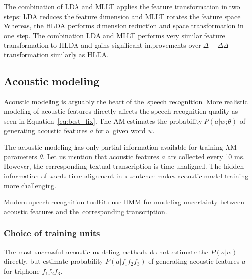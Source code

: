 {The combination of \ac{LDA} and \ac{MLLT} applies the feature transformation in two steps: \ac{LDA} reduces the feature dimension and \ac{MLLT} rotates the feature space \cite{gopinath1998maximum}
Whereas, the \ac{HLDA} performs dimension reduction and space transformation in one step.\cite{gales1999semi}
The combination \ac{LDA} and \ac{MLLT} performs very similar feature transformation to \ac{HLDA} and gains significant improvements over $\Delta+\Delta\Delta$ transformation similarly as \ac{HLDA}\cite{gales1999semi}\cite{gopinath1998maximum}.


\subsection{Acoustic modeling}
\label{sub:am}
Acoustic modeling is arguably the heart of the~speech recognition.
More realistic modeling of acoustic features directly affects the speech recognition quality as seen in Equation~\ref{eq:best_fix}. 
The \ac{AM} estimates the probability $P(a|w; \theta)$ of generating acoustic features $a$ for a~given word $w$.

The acoustic modeling has only partial information available for training \ac{AM} parameters $\theta$.
Let us mention that acoustic features $a$ are collected every 10 ms.
However, the corresponding textual transcription is time-unaligned.
The hidden information of words time alignment in a sentence makes acoustic model training more challenging.

Modern speech recognition toolkits use \acl{HMM}
for modeling uncertainty between acoustic features and the~corresponding transcription. 

\subsubsection*{Choice of training units}
The most successful acoustic modeling methods do not estimate the $P(a|w)$ directly, but estimate probability $P(a|f_1f_2f_3)$ of generating acoustic features $a$ for triphone $f_1f_2f_3$.

}
